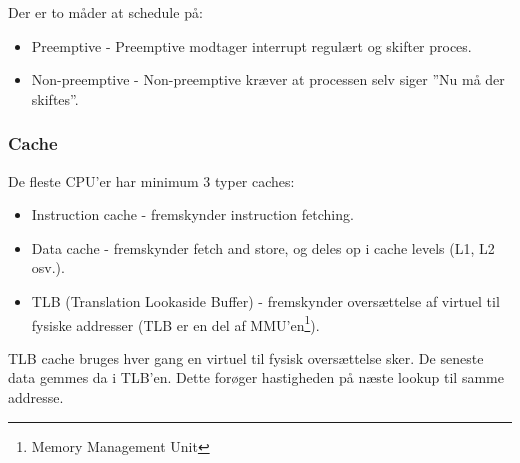 Der er to måder at schedule på:

\begin{itemize}
	\item Preemptive - Preemptive modtager interrupt regulært og skifter proces.
	\item Non-preemptive - Non-preemptive kræver at processen selv siger ''Nu må der skiftes''.
\end{itemize}

\subsubsection{Cache}
De fleste CPU'er har minimum 3 typer caches:
\begin{itemize}
	\item Instruction cache - fremskynder instruction fetching.
	\item Data cache - fremskynder fetch and store, og deles op i cache levels (L1, L2 osv.).
	\item TLB (Translation Lookaside Buffer) - fremskynder oversættelse af virtuel til fysiske addresser (TLB er en del af MMU'en\footnote{Memory Management Unit}).
\end{itemize}
TLB cache bruges hver gang en virtuel til fysisk oversættelse sker. De seneste data gemmes da i TLB’en. Dette forøger hastigheden på næste lookup til samme addresse.